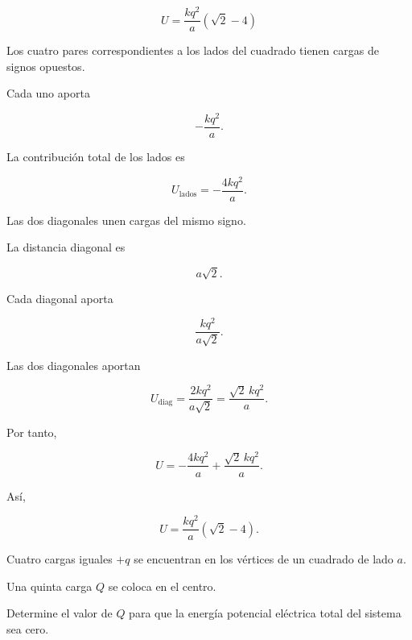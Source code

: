 \begin{respuesta}

\[
\boxed{
U=
\frac{kq^2}{a}
\left(
\sqrt2-4
\right)
}
\]

\end{respuesta}

\begin{explicacion}

Los cuatro pares correspondientes a los lados del cuadrado tienen cargas de signos
opuestos.

Cada uno aporta

\[
-\frac{kq^2}{a}.
\]

La contribución total de los lados es

\[
U_{\text{lados}}
=
-\frac{4kq^2}{a}.
\]

Las dos diagonales unen cargas del mismo signo.

La distancia diagonal es

\[
a\sqrt2.
\]

Cada diagonal aporta

\[
\frac{kq^2}{a\sqrt2}.
\]

Las dos diagonales aportan

\[
U_{\text{diag}}
=
\frac{2kq^2}{a\sqrt2}
=
\frac{\sqrt2\,kq^2}{a}.
\]

Por tanto,

\[
U
=
-\frac{4kq^2}{a}
+
\frac{\sqrt2\,kq^2}{a}.
\]

Así,

\[
\boxed{
U=
\frac{kq^2}{a}
\left(
\sqrt2-4
\right)
}.
\]

\end{explicacion}


\begin{ejercicio}

Cuatro cargas iguales \(+q\) se encuentran en los vértices de un cuadrado de lado
\(a\).

Una quinta carga \(Q\) se coloca en el centro.

Determine el valor de \(Q\) para que la energía potencial eléctrica total del sistema
sea cero.

\begin{center}
\end{center}

\end{ejercicio}

